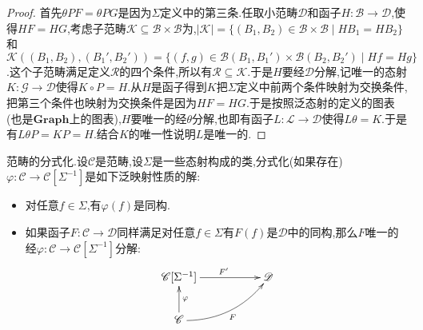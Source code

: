 \begin{enumerate}
\begin{proof}
        首先$\theta PF=\theta PG$是因为$\Sigma$定义中的第三条.任取小范畴$\mathscr{D}$和函子$H:\mathscr{B}\to\mathscr{D}$,使得$HF=HG$,考虑子范畴$\mathscr{K}\subseteq\mathscr{B}\times\mathscr{B}$为,$|\mathscr{K}|=\{(B_1,B_2)\in\mathscr{B}\times\mathscr{B}\mid HB_1=HB_2\}$和$\mathscr{K}((B_1,B_2),(B_1',B_2'))=\{(f,g)\in\mathscr{B}(B_1,B_1')\times\mathscr{B}(B_2,B_2')\mid Hf=Hg\}$.这个子范畴满足定义$\mathscr{R}$的四个条件,所以有$\mathscr{R}\subseteq\mathscr{K}$.于是$H$要经$\mathscr{D}$分解,记唯一的态射$K:\mathscr{G}\to\mathscr{D}$使得$K\circ P=H$.从$H$是函子得到$K$把$\Sigma$定义中前两个条件映射为交换条件,把第三个条件也映射为交换条件是因为$HF=HG$.于是按照泛态射的定义的图表(也是$\textbf{Graph}$上的图表),$H$要唯一的经$\theta$分解,也即有函子$L:\mathscr{L}\to\mathscr{D}$使得$L\theta=K$.于是有$L\theta P=KP=H$.结合$K$的唯一性说明$L$是唯一的.
    \end{proof}
\end{enumerate}

范畴的分式化.设$\mathscr{C}$是范畴,设$\Sigma$是一些态射构成的类,分式化(如果存在)$\varphi:\mathscr{C}\to\mathscr{C}[\Sigma^{-1}]$是如下泛映射性质的解:
\begin{itemize}
	\item 对任意$f\in\Sigma$,有$\varphi(f)$是同构.
	\item 如果函子$F:\mathscr{C}\to\mathscr{D}$同样满足对任意$f\in\Sigma$有$F(f)$是$\mathscr{D}$中的同构,那么$F$唯一的经$\varphi:\mathscr{C}\to\mathscr{C}[\Sigma^{-1}]$分解:
	$$\xymatrix{\mathscr{C}[\Sigma^{-1}]\ar[rr]^{F'}&&\mathscr{D}\\\mathscr{C}\ar[u]_{\varphi}\ar@/_1pc/[urr]_F&&}$$
\end{itemize}

